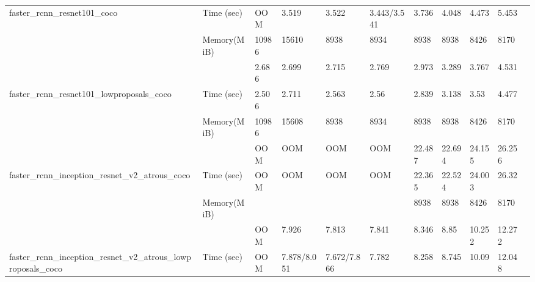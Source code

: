 \documentclass[conference]{IEEEtran}
\begin{document}
\begin{table}[]
{\begin{tabular}{lllllllllll}
faster\_rcnn\_resnet101\_coco                                   & Time (sec)    & OOM                 & 3.519              & 3.522             & 3.443/3.541       & 3.736            & 4.048  & 4.473             & 5.453       &          \\
                                                                & Memory(MiB)   & 10986               & 15610              & 8938              & 8934              & 8938             & 8938   & 8426              & 8170        &          \\
                                                                &               & 2.686               & 2.699              & 2.715             & 2.769             & 2.973            & 3.289  & 3.767             & 4.531       &          \\
faster\_rcnn\_resnet101\_lowproposals\_coco                     & Time (sec)    & 2.506               & 2.711              & 2.563             & 2.56              & 2.839            & 3.138  & 3.53              & 4.477       &          \\
                                                                & Memory(MiB)   & 10986               & 15608              & 8938              & 8934              & 8938             & 8938   & 8426              & 8170        &          \\
                                                                &               & OOM                 & OOM                & OOM               & OOM               & 22.487           & 22.694 & 24.155            & 26.256      &          \\
faster\_rcnn\_inception\_resnet\_v2\_atrous\_coco               & Time (sec)    & OOM                 & OOM                & OOM               & OOM               & 22.365           & 22.524 & 24.003            & 26.32       &          \\
                                                                & Memory(MiB)   &                     &                    &                   &                   & 8938             & 8938   & 8426              & 8170        &          \\
                                                                &               & OOM                 & 7.926              & 7.813             & 7.841             & 8.346            & 8.85   & 10.252            & 12.272      &          \\
faster\_rcnn\_inception\_resnet\_v2\_atrous\_lowproposals\_coco & Time (sec)    & OOM                 & 7.878/8.051        & 7.672/7.866       & 7.782             & 8.258            & 8.745  & 10.09             & 12.048      &          \\

\end{tabular}}
\end{table}
\end{document}
